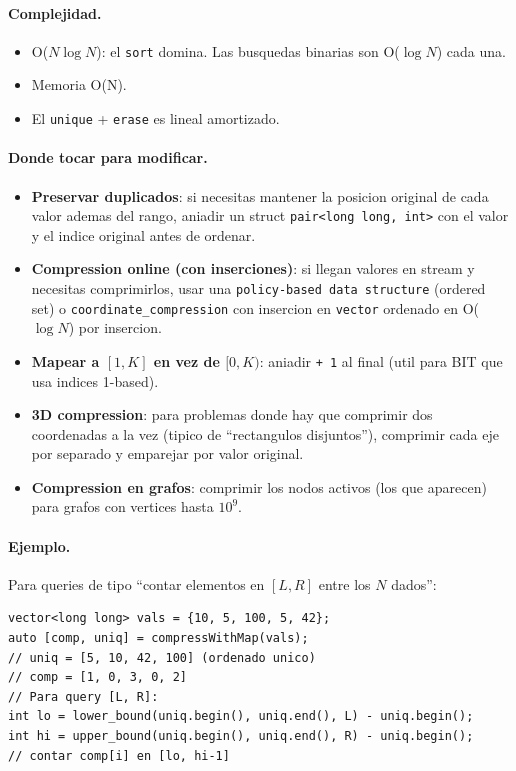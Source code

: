 \paragraph{Complejidad.}
\begin{itemize}\setlength\itemsep{0pt}
	\item O($N \log N$): el \texttt{sort} domina. Las busquedas binarias son O($\log N$) cada una.
	\item Memoria O(N).
	\item El \texttt{unique} + \texttt{erase} es lineal amortizado.
\end{itemize}

\paragraph{Donde tocar para modificar.}
\begin{itemize}\setlength\itemsep{0pt}
	\item \textbf{Preservar duplicados}: si necesitas mantener la posicion original de cada valor ademas del rango, aniadir un struct \texttt{pair<long long, int>} con el valor y el indice original antes de ordenar.
	\item \textbf{Compression online (con inserciones)}: si llegan valores en stream y necesitas comprimirlos, usar una \texttt{policy-based data structure} (ordered set) o \texttt{coordinate\_compression} con insercion en \texttt{vector} ordenado en O($\log N$) por insercion.
	\item \textbf{Mapear a $[1, K]$ en vez de $[0, K)$}: aniadir \texttt{+ 1} al final (util para BIT que usa indices 1-based).
	\item \textbf{3D compression}: para problemas donde hay que comprimir dos coordenadas a la vez (tipico de ``rectangulos disjuntos''), comprimir cada eje por separado y emparejar por valor original.
	\item \textbf{Compression en grafos}: comprimir los nodos activos (los que aparecen) para grafos con vertices hasta $10^9$.
\end{itemize}

\paragraph{Ejemplo.}
Para queries de tipo ``contar elementos en $[L, R]$ entre los $N$ dados'':
\begin{verbatim}
vector<long long> vals = {10, 5, 100, 5, 42};
auto [comp, uniq] = compressWithMap(vals);
// uniq = [5, 10, 42, 100] (ordenado unico)
// comp = [1, 0, 3, 0, 2]
// Para query [L, R]:
int lo = lower_bound(uniq.begin(), uniq.end(), L) - uniq.begin();
int hi = upper_bound(uniq.begin(), uniq.end(), R) - uniq.begin();
// contar comp[i] en [lo, hi-1]
\end{verbatim}

